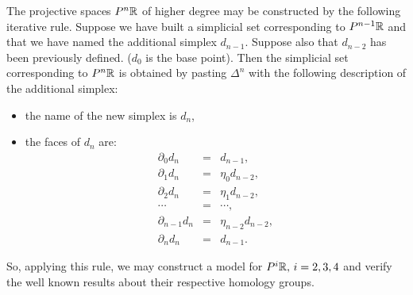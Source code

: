 The projective spaces $P^n{{\Bbb R}}$ of higher degree may be constructed by the following iterative
rule. Suppose we have built a simplicial set corresponding to $P^{n-1}{{\Bbb R}}$ and that we have
named the  additional simplex $d_{n-1}$. Suppose also that $d_{n-2}$ has been previously defined.
($d_0$ is the base point). 
Then the simplicial set corresponding to $P^n{{\Bbb R}}$ is obtained by pasting $\Delta^n$ with the following
description of the additional simplex: 
\begin{itemize}
\item the name of the new simplex is  $d_n$,
\item the  faces of $d_n$ are:
\begin{eqnarray*}
\partial_0 d_n & = & d_{n-1},\\
\partial_1 d_n & = & \eta_0 d_{n-2},\\
\partial_2 d_n & = & \eta_1 d_{n-2},\\
\cdots         & = & \cdots , \\
\partial_{n-1} d_n & = & \eta_{n-2} d_{n-2},\\
\partial_n d_n & = & d_{n-1}.
\end{eqnarray*}
\end{itemize}
So, applying this rule, we may construct a  model for  $P^i{{\Bbb R}},\, i=2,3,4$ and verify  the well known results
about their respective homology groups.
